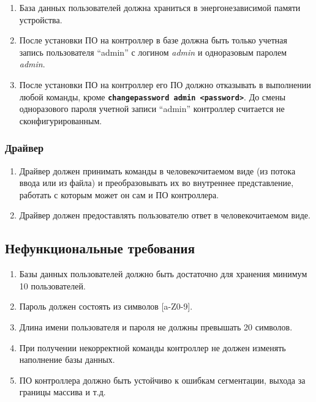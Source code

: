 \documentclass[14pt]{extarticle}
\begin{document}
\begin{enumerate}

 \item База данных пользователей должна храниться в энергонезависимой
  памяти устройства.

 \item После установки ПО на контроллер в базе должна быть только учетная запись
  пользователя ``admin'' с логином \textit{admin} и одноразовым паролем
  \textit{admin}.

 \item После установки ПО на контроллер его ПО должно отказывать в выполнении
  любой команды, кроме \texttt{\textbf{changepassword admin <password>}}.
  До смены одноразового пароля учетной записи ``admin'' контроллер считается не
  сконфигурированным.

\end{enumerate}

\subsubsection{Драйвер}

\begin{enumerate}

 \item Драйвер должен принимать команды в человекочитаемом виде (из потока
  ввода или из файла) и преобразовывать их во внутреннее представление, работать
  с которым может он сам и ПО контроллера.

 \item Драйвер должен предоставлять пользователю ответ в человекочитаемом виде.

\end{enumerate}

\subsection{Нефункциональные требования}

\begin{enumerate}

 \item Базы данных пользователей должно быть достаточно для хранения минимум
  10 пользователей.

 \item Пароль должен состоять из символов [a-Z0-9].

 \item Длина имени пользователя и пароля не должны превышать 20 символов.

 \item При получении некорректной команды контроллер не должен изменять
  наполнение базы данных.

 \item ПО контроллера должно быть устойчиво к ошибкам сегментации, выхода за
  границы массива и т.д.

\end{enumerate}
\end{document}
